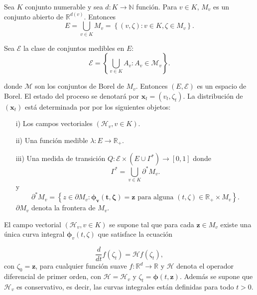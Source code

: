 \documentclass{article}
\newcommand{\nat}{\mathbb{N}}
\newcommand{\rea}{\mathbb{R}}
\begin{document}
Sea $K$ conjunto numerable y sea $d:K\rightarrow\nat$ funci\'on.
Para $v\in K$, $M_{v}$ es un conjunto abierto de
$\rea^{d\left(v\right)}$. Entonces \[E=\bigcup_{v\in
K}M_{v}=\left\{\left(v,\zeta\right):v\in K,\zeta\in
M_{v}\right\}.\]

Sea $\mathcal{E}$ la clase de conjuntos medibles en $E$:
\[\mathcal{E}=\left\{\bigcup_{v\in K}A_{v}:A_{v}\in \mathcal{M}_{v}\right\}.\]

donde $\mathcal{M}$ son los conjuntos de Borel de $M_{v}$.
Entonces $\left(E,\mathcal{E}\right)$ es un espacio de Borel. El
estado del proceso se denotar\'a por
$\mathbf{x}_{t}=\left(v_{t},\zeta_{t}\right)$. La distribuci\'on
de $\left(\mathbf{x}_{t}\right)$ est\'a determinada por por los
siguientes objetos:

\begin{itemize}
\item[i)] Los campos vectoriales $\left(\mathcal{H}_{v},v\in
K\right)$. \item[ii)] Una funci\'on medible $\lambda:E\rightarrow
\rea_{+}$. \item[iii)] Una medida de transici\'on
$Q:\mathcal{E}\times\left(E\cup\Gamma^{*}\right)\rightarrow\left[0,1\right]$
donde
\begin{equation}
\Gamma^{*}=\bigcup_{v\in K}\partial^{*}M_{v}.
\end{equation}
y
\begin{equation}
\partial^{*}M_{v}=\left\{z\in\partial M_{v}:\mathbf{\mathbf{\phi}_{v}\left(t,\zeta\right)=\mathbf{z}}\textrm{ para alguna }\left(t,\zeta\right)\in\rea_{+}\times M_{v}\right\}.
\end{equation}
$\partial M_{v}$ denota  la frontera de $M_{v}$.
\end{itemize}

El campo vectorial $\left(\mathcal{H}_{v},v\in K\right)$ se supone
tal que para cada $\mathbf{z}\in M_{v}$ existe una \'unica curva
integral $\mathbf{\phi}_{v}\left(t,\zeta\right)$ que satisface la
ecuaci\'on

\begin{equation}
\frac{d}{dt}f\left(\zeta_{t}\right)=\mathcal{H}f\left(\zeta_{t}\right),
\end{equation}
con $\zeta_{0}=\mathbf{z}$, para cualquier funci\'on suave
$f:\rea^{d}\rightarrow\rea$ y $\mathcal{H}$ denota el operador
diferencial de primer orden, con $\mathcal{H}=\mathcal{H}_{v}$ y
$\zeta_{t}=\mathbf{\phi}\left(t,\mathbf{z}\right)$. Adem\'as se
supone que $\mathcal{H}_{v}$ es conservativo, es decir, las curvas
integrales est\'an definidas para todo $t>0$.
\end{document}
